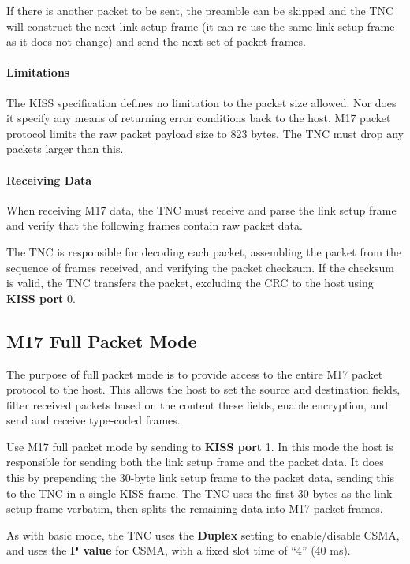 \documentclass[a4paper,11pt,oneside]{article}
\begin{document}
If there is another packet to be sent, the preamble can be skipped and the TNC will construct the next link setup frame (it can re-use the same link setup frame as it does not change) and send the next set of packet frames.

\paragraph{Limitations}

The KISS specification defines no limitation to the packet size allowed. Nor does it specify any means of returning error conditions back to the host. M17 packet protocol limits the raw packet payload size to 823 bytes. The TNC must drop any packets larger than this.

\paragraph{Receiving Data}

When receiving M17 data, the TNC must receive and parse the link setup frame and verify that the following frames contain raw packet data.

The TNC is responsible for decoding each packet, assembling the packet from the sequence of frames received, and verifying the packet checksum. If the checksum is valid, the TNC transfers the packet, excluding the CRC to the host using \textbf{KISS port} 0.

\subsection{M17 Full Packet Mode}

The purpose of full packet mode is to provide access to the entire M17 packet protocol to the host. This allows the host to set the source and destination fields, filter received packets based on the content these fields, enable encryption, and send and receive type-coded frames.

Use M17 full packet mode by sending to \textbf{KISS port} 1. In this mode the host is responsible for sending both the link setup frame and the packet data. It does this by prepending the 30-byte link setup frame to the packet data, sending this to the TNC in a single KISS frame. The TNC uses the first 30 bytes as the link setup frame verbatim, then splits the remaining data into M17 packet frames.

As with basic mode, the TNC uses the \textbf{Duplex} setting to enable/disable CSMA, and uses the \textbf{P value} for CSMA, with a fixed slot time of ``4'' (40 ms).
\end{document}
